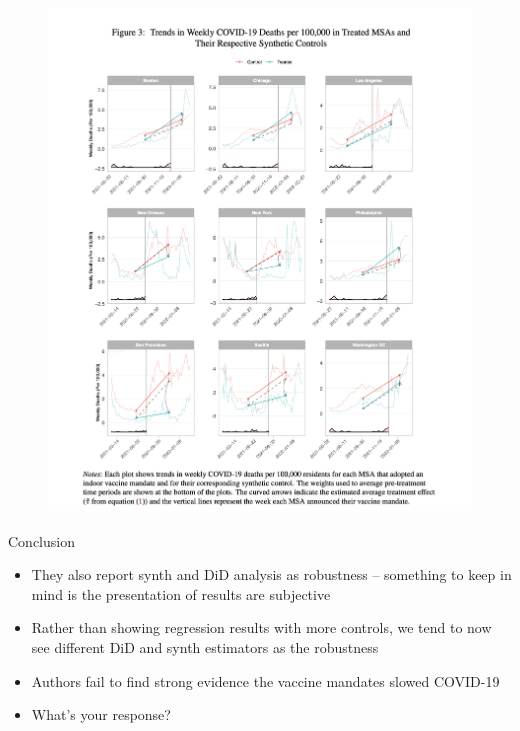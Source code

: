 \documentclass{beamer}
\begin{document}
\begin{frame}[plain]

	\begin{figure}
	\includegraphics[scale=0.3]{./lecture_includes/vitor_figure3}
	\end{figure}

\end{frame}


\begin{frame}{Conclusion}

\begin{itemize}

\item They also report synth and DiD analysis as robustness -- something to keep in mind is the presentation of results are subjective
\item Rather than showing regression results with more controls, we tend to now see different DiD and synth estimators as the robustness
\item Authors fail to find strong evidence the vaccine mandates slowed COVID-19
\item What's your response?

\end{itemize}

\end{frame}
\end{document}
